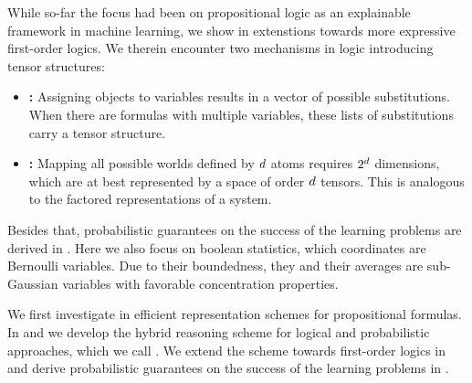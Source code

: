 While so-far the focus had been on propositional logic as an explainable framework in machine learning, we show in  extenstions towards more expressive first-order logics.
We therein encounter two mechanisms in logic introducing tensor structures:
\begin{itemize}
    \item \textbf{\SubstitutionStructure{}:} Assigning objects to variables results in a vector of possible substitutions. When there are formulas with multiple variables, these lists of substitutions carry a tensor structure.
    \item \textbf{\SemanticStructure{}:} Mapping all possible worlds defined by $d$ atoms requires $2^{d}$ dimensions, which are at best represented by a space of order $d$ tensors.
    This is analogous to the factored representations of a system.
\end{itemize}


Besides that, probabilistic guarantees on the success of the learning problems are derived in .
Here we also focus on boolean statistics, which coordinates are Bernoulli variables.
Due to their boundedness, they and their averages are sub-Gaussian variables with favorable concentration properties.


We first investigate in  efficient representation schemes for propositional formulas.
In  and  we develop the hybrid reasoning scheme for logical and probabilistic approaches, which we call \HybridLogicNetworks{}.
We extend the scheme towards first-order logics in  and derive probabilistic guarantees on the success of the learning problems in .
